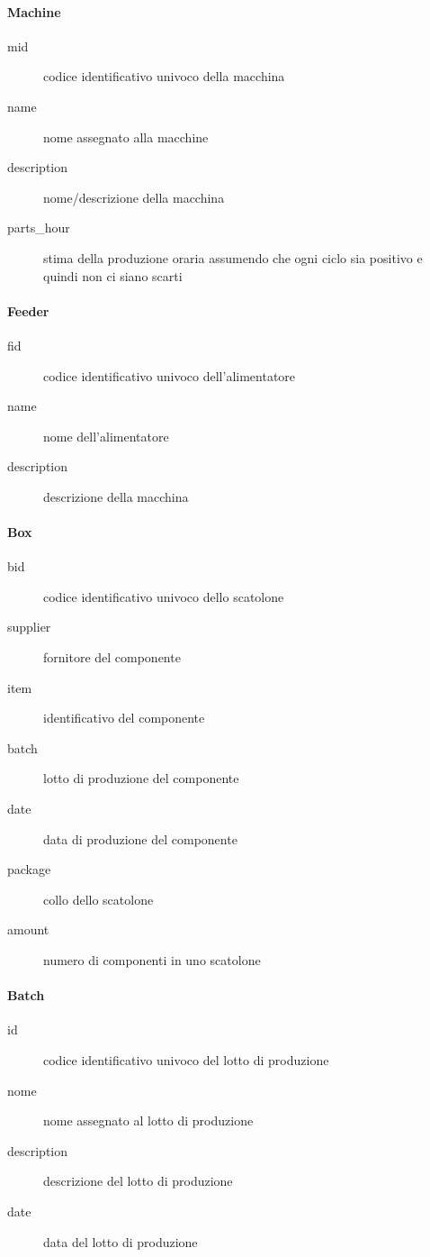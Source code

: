 \paragraph{Machine}
\begin{description}
\item[mid] codice identificativo univoco della macchina
\item[name] nome assegnato alla macchine
\item[description] nome/descrizione della macchina
\item[parts\_hour] stima della produzione oraria assumendo che ogni ciclo sia positivo e quindi non ci siano scarti
\end{description}

\paragraph{Feeder}
\begin{description}
\item[fid] codice identificativo univoco dell'alimentatore
\item[name] nome dell'alimentatore
\item[description] descrizione della macchina
\end{description}

\paragraph{Box}
\begin{description}
\item[bid] codice identificativo univoco dello scatolone
\item[supplier] fornitore del componente
\item[item] identificativo del componente
\item[batch] lotto di produzione del componente
\item[date] data di produzione del componente
\item[package] collo dello scatolone
\item[amount] numero di componenti in uno scatolone
\end{description}

\paragraph{Batch}
\begin{description}
\item[id] codice identificativo univoco del lotto di produzione
\item[nome] nome assegnato al lotto di produzione
\item[description] descrizione del lotto di produzione
\item[date] data del lotto di produzione
\end{description}

